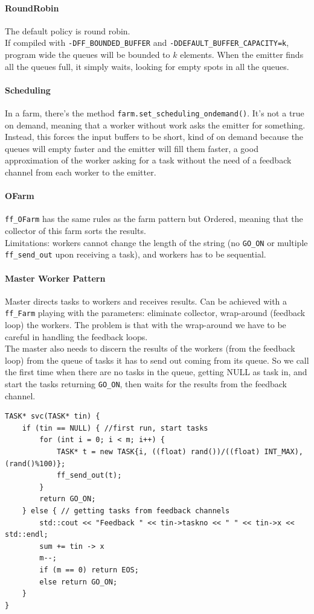 \documentclass[10pt]{report}
\begin{document}
\paragraph{RoundRobin} The default policy is round robin.\\
If compiled with \texttt{-DFF\_BOUNDED\_BUFFER} and \texttt{-DDEFAULT\_BUFFER\_CAPACITY=k}, program wide the queues will be bounded to $k$ elements. When the emitter finds all the queues full, it simply waits, looking for empty spots in all the queues.
\paragraph{Scheduling} In a farm, there's the method \texttt{farm.set\_scheduling\_ondemand()}. It's not a true on demand, meaning that a worker without work asks the emitter for something. Instead, this forces the input buffers to be short, kind of on demand because the queues will empty faster and the emitter will fill them faster, a good approximation of the worker asking for a task without the need of a feedback channel from each worker to the emitter.
\paragraph{OFarm} \texttt{ff\_OFarm} has the same rules as the farm pattern but Ordered, meaning that the collector of this farm sorts the results.\\
Limitations: workers cannot change the length of the string (no \texttt{GO\_ON} or multiple \texttt{ff\_send\_out} upon receiving a task), and workers has to be sequential.
\paragraph{Master Worker Pattern} Master directs tasks to workers and receives results. Can be achieved with a \texttt{ff\_Farm} playing with the parameters: eliminate collector, wrap-around (feedback loop) the workers. The problem is that with the wrap-around we have to be careful in handling the feedback loops.\\
The master also needs to discern the results of the workers (from the feedback loop) from the queue of tasks it has to send out coming from its queue. So we call the first time when there are no tasks in the queue, getting NULL as task in, and start the tasks returning \texttt{GO\_ON}, then waits for the results from the feedback channel.
\begin{lstlisting}[style=myC]
TASK* svc(TASK* tin) {
	if (tin == NULL) { //first run, start tasks
		for (int i = 0; i < m; i++) {
			TASK* t = new TASK{i, ((float) rand())/((float) INT_MAX), (rand()%100)};
			ff_send_out(t);
		}
		return GO_ON;
	} else { // getting tasks from feedback channels
		std::cout << "Feedback " << tin->taskno << " " << tin->x << std::endl;
		sum += tin -> x
		m--;
		if (m == 0) return EOS;
		else return GO_ON;
	}
}
\end{lstlisting}
\end{document}
